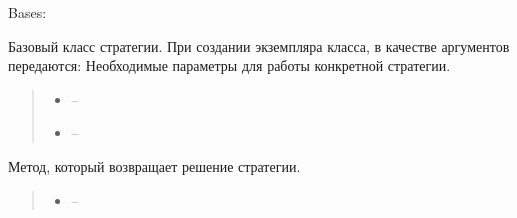 \documentclass[letterpaper,10pt,english,openany,oneside]{sphinxmanual}
\begin{document}
\begin{fulllineitems}
\label{\detokenize{src.structures:src.structures.st_strategies.BaseStrategy}}
\pysigstartsignatures
{}
\pysigstopsignatures
\sphinxAtStartPar
Bases: 

\sphinxAtStartPar
Базовый класс стратегии. При создании экземпляра класса, в качестве аргументов передаются:
Необходимые параметры для работы конкретной стратегии.

\begin{fulllineitems}
\label{\detokenize{src.structures:src.structures.st_strategies.BaseStrategy.__init__}}
\pysigstartsignatures
{}
\pysigstopsignatures\begin{quote}\begin{description}
\begin{itemize}
\item {} 
\sphinxAtStartPar
{} – 

\item {} 
\sphinxAtStartPar
{} – 

\end{itemize}

\end{description}\end{quote}

\end{fulllineitems}


\begin{fulllineitems}
\label{\detokenize{src.structures:src.structures.st_strategies.BaseStrategy.get_decision}}
\pysigstartsignatures
{}
\pysigstopsignatures
\sphinxAtStartPar
Метод, который возвращает решение стратегии.
\begin{quote}\begin{description}
\begin{itemize}
\item {} 
\sphinxAtStartPar
{} – 


\end{itemize}
\end{description}
\end{quote}
\end{fulllineitems}
\end{fulllineitems}
\end{document}
